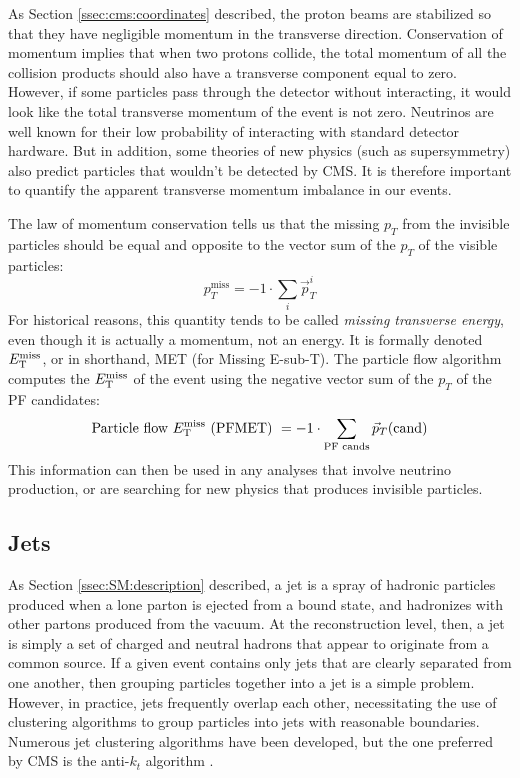 As Section \ref{ssec:cms:coordinates} described, the proton beams are
stabilized so that they have negligible momentum in the transverse
direction. Conservation of momentum implies that when two protons
collide, the total momentum of all the collision products should also
have a transverse component equal to zero. However, if some particles
pass through the detector without interacting, it would look like
the total transverse momentum of the event is not zero. Neutrinos are
well known for their low probability of interacting with standard
detector hardware. But in addition, some theories of new physics (such
as supersymmetry) also predict particles that wouldn't be detected by
CMS. It is therefore important to quantify the apparent transverse
momentum imbalance in our events.

The law of momentum conservation tells us that the missing $p_T$ from
the invisible particles should be equal and opposite to the vector sum
of the $p_T$ of the visible particles:
\begin{equation}
p_T^\text{miss} = -1 \cdot \sum_i \vec{p}_T^i
\end{equation}
For historical reasons, this quantity tends to be called \emph{missing
  transverse energy}, even though it is actually a momentum, not an
energy. It is formally denoted $E_\text{T}^\text{miss}$, or in shorthand, MET (for
Missing E-sub-T). The particle flow algorithm computes the $E_\text{T}^\text{miss}$ of
the event using the negative vector sum of the $p_T$ of the PF
candidates:
\begin{equation}
\text{Particle flow } E_\text{T}^\text{miss} \text{ (PFMET) } =
-1 \cdot \sum_\text{PF cands} \vec{p}_T \text{(cand)}
\end{equation}
This information can then be used in any analyses that involve
neutrino production, or are searching for new physics that produces
invisible particles.

\subsection{Jets}
\label{ssec:cms:reco:jets}

As Section \ref{ssec:SM:description} described, a jet is a spray
of hadronic particles produced when a lone parton is ejected
from a bound state, and hadronizes with other
partons produced from the vacuum. At the reconstruction level, then,
a jet is simply a set of charged and neutral hadrons that appear to
originate from a common source. If a given event contains only jets
that are clearly separated from one another, then grouping particles
together into a jet is a simple problem. However, in practice, jets
frequently overlap each other, necessitating the use of clustering
algorithms to group particles into jets with reasonable
boundaries. Numerous jet clustering algorithms have been developed,
but the one preferred by CMS is the anti-$k_t$ algorithm
\cite{antikt}.

